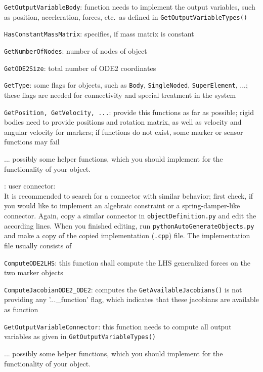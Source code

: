     \item \texttt{GetOutputVariableBody}: function needs to implement the output variables, such as position, acceleration, forces, etc.\ as defined in \texttt{GetOutputVariableTypes()}
    \item \texttt{HasConstantMassMatrix}: specifies, if mass matrix is constant
    \item \texttt{GetNumberOfNodes}: number of nodes of object
    \item \texttt{GetODE2Size}: total number of \ac{ODE2} coordinates
    \item \texttt{GetType}: some flags for objects, such as \texttt{Body}, \texttt{SingleNoded}, \texttt{SuperElement}, ...; these flags are needed for connectivity and special treatment in the system
    \item \texttt{GetPosition, GetVelocity, ...}: provide this functions as far as possible; rigid bodies need to provide positions and rotation matrix, as well as velocity and angular velocity for markers; if functions do not exist, some marker or sensor functions may fail
    \item ...   possibly some helper functions, which you should implement for the functionality of your object.
  \ei
  \item {}: user connector:\\
  It is recommended to search for a connector with similar behavior; first check, if you would like to implement 
  an algebraic constraint or a spring-damper-like connector.
  Again, copy a similar connector in \texttt{objectDefinition.py} and edit the according lines. 
  When you finished editing, run \texttt{pythonAutoGenerateObjects.py} and make a copy of the copied implementation (\texttt{.cpp}) file.
  The implementation file usually consists of
  \bi
    \item \texttt{ComputeODE2LHS}: this function shall compute the \ac{LHS} generalized forces on the two marker objects
    \item \texttt{ComputeJacobianODE2\_ODE2}: computes the \texttt{GetAvailableJacobians()} is not providing any '...\_function' flag, which indicates that these jacobians are available as function
    \item \texttt{GetOutputVariableConnector}: this function needs to compute all output variables as given in \texttt{GetOutputVariableTypes()}
    \item ...   possibly some helper functions, which you should implement for the functionality of your object.
  \ei
\ei



